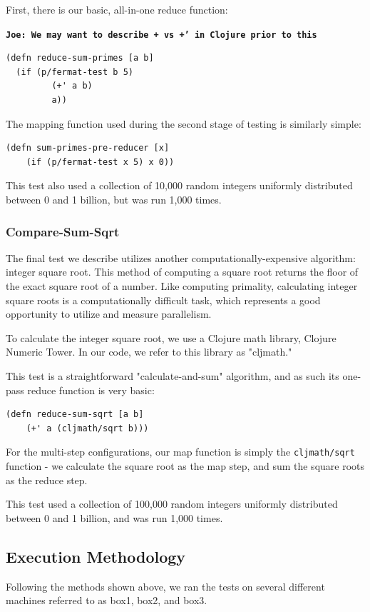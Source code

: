 \documentclass[12pt]{article}
\newcommand{\comment}[1]{{\bf \tt  {#1}}}
\newcommand{\joecomment}[1]{\textcolor{JoesGold}{\comment{Joe: {#1}}}}
\begin{document}
First, there is our basic, all-in-one reduce function:

\joecomment{We may want to describe + vs +' in Clojure prior to this}
\begin{verbatim}
(defn reduce-sum-primes [a b]
  (if (p/fermat-test b 5)
         (+' a b)
         a))
\end{verbatim}

The mapping function used during the second stage of testing is similarly simple:

\begin{verbatim}
(defn sum-primes-pre-reducer [x] 
    (if (p/fermat-test x 5) x 0))
\end{verbatim}

This test also used a collection of 10,000 random integers uniformly distributed between 0 and 1 billion, but was run 1,000 times.
 
\subsubsection{Compare-Sum-Sqrt}\label{sec:sum-sqrt}
 
The final test we describe utilizes another computationally-expensive algorithm: integer square root. This method of computing a square root returns the floor of the exact square root of a number. Like computing primality, calculating integer square roots is a computationally difficult task, which represents a good opportunity to utilize and measure parallelism. 

To calculate the integer square root, we use a Clojure math library, Clojure Numeric Tower. In our code, we refer to this library as "cljmath."

This test is a straightforward "calculate-and-sum" algorithm, and as such its one-pass reduce function is very basic:

\begin{verbatim}
(defn reduce-sum-sqrt [a b] 
    (+' a (cljmath/sqrt b)))
\end{verbatim}

For the multi-step configurations, our map function is simply the \texttt{cljmath/sqrt} function - we calculate the square root as the map step, and sum the square roots as the reduce step.
 
This test used a collection of 100,000 random integers uniformly distributed between 0 and 1 billion, and was run 1,000 times.
 
 \subsection{Execution Methodology}\label{sec:eMethods}
 Following the methods shown above, we ran the tests on several different machines referred to as box1, box2, and box3.
 
\end{document}
